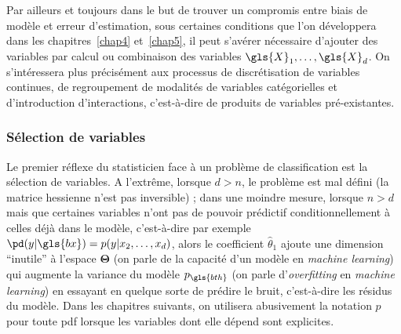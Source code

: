 Par ailleurs et toujours dans le but de trouver un compromis entre biais de modèle et erreur d'estimation, sous certaines conditions que l'on développera dans les chapitres~\ref{chap4} et~\ref{chap5}, il peut s'avérer nécessaire d'ajouter des variables par calcul ou combinaison des variables $\gls{X}_1,\dots,\gls{X}_d$. On s'intéressera plus précisément aux processus de discrétisation de variables continues, de regroupement de modalités de variables catégorielles et d'introduction d'interactions, c'est-à-dire de produits de variables pré-existantes. 

\subsubsection{Sélection de variables} \label{subsubsec:selection}

Le premier réflexe du statisticien face à un problème de classification est la sélection de variables. A l'extrême, lorsque $d > n$, le problème est mal défini (la matrice hessienne n'est pas inversible) ; dans une moindre mesure, lorsque $n > d$ mais que certaines variables n'ont pas de pouvoir prédictif conditionnellement à celles déjà dans le modèle, c'est-à-dire par exemple $\pd(y | \gls{bx}) = p(y|x_2,\dots,x_d)$, alors le coefficient $\hat{\theta}_1$ ajoute une dimension ``inutile'' à l'espace $\bm{\Theta}$ (on parle de la capacité d'un modèle en \textit{machine learning}) qui augmente la variance du modèle $p_{\gls{bth}}$ (on parle d'\textit{overfitting} en \textit{machine learning}) en essayant en quelque sorte de prédire le bruit, c'est-à-dire les résidus du modèle. Dans les chapitres suivants, on utilisera abusivement la notation $p$ pour toute \gls{pdf} lorsque les variables dont elle dépend sont explicites.



